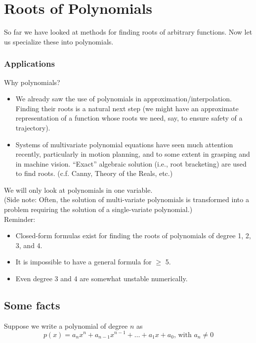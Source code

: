 \chapter{Roots of Polynomials}

So far we have looked at methods for finding roots of arbitrary functions. Now let us specialize these into polynomials. \newline

\subsection*{Applications} 
Why polynomials?
\begin{itemize}
    \item We already saw the use of polynomials in approximation/interpolation. Finding their roots is a natural next step (we might have an approximate representation of a function whose roots we need, say, to ensure safety of a trajectory).
    \item Systems of multivariate polynomial equations have seen much attention recently, particularly in motion planning, and to some extent in grasping and in machine vision. ``Exact'' algebraic solution (i.e., root bracketing) are used to find roots. (c.f. Canny, Theory of the Reals, etc.)
\end{itemize}

We will only look at polynomials in one variable. \\
(Side note: Often, the solution of multi-variate polynomials is transformed into a problem requiring the solution of a single-variate polynomial.) \\

Reminder: 
\begin{itemize}
    \item Closed-form formulas exist for finding the roots of polynomials of degree 1, 2, 3, and 4.
    \item It is impossible to have a general formula for $\geq$ 5.
    \item Even degree 3 and 4 are somewhat unstable numerically.
\end{itemize}

\section{Some facts}

Suppose  we write a polynomial of degree $n$ as
$$p(x) = a_n x^n + a_{n-1} x^{n-1} + \dots + a_1 x + a_0\text{, with }a_n \neq 0$$

